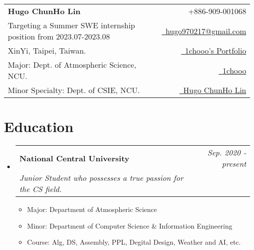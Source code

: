 \documentclass[a4paper,11pt]{article}
\makeatletter
\newcommand{\resumeSubheading}[4]{
\vspace{0.5mm}\item
    \begin{tabular*}{0.98\textwidth}[t]{l@{\extracolsep{\fill}}r}
        \textbf{#1} & \textit{\footnotesize{#4}} \\
        \textit{\footnotesize{#3}} &  \footnotesize{#2}\\
    \end{tabular*}
    \vspace{-2.4mm}
}
\newcommand{\resumeSubHeadingListStart}{\begin{itemize}[leftmargin=*,labelsep=0mm]}
\newcommand{\resumeItemListStart}{\begin{justify}\begin{itemize}[leftmargin=3ex, rightmargin=2ex, noitemsep,labelsep=1.2mm,itemsep=0mm]\small}
\newcommand{\resumeSubHeadingListEnd}{\end{itemize}\vspace{2mm}}
\newcommand{\resumeItemListEnd}{\end{itemize}\end{justify}\vspace{-2mm}}
\newcommand{\name}{Hugo ChunHo Lin} %
\newcommand{\course}{Dept. of Atmospheric Science, NCU.} %
\newcommand{\phone}{909-001068} %
\newcommand{\emaila}{hugo970217@gmail.com} %
\newcommand{\myScore}{}
\makeatother
\begin{document}
\selectfont


\parbox{\textwidth}{
\begin{tabularx}{\linewidth}{L r} \\
  \textbf{\huge \name} & {\raisebox{0.0\height}{\footnotesize \faPhone}\ +886-\phone}\\ Targeting a Summer SWE internship position from 2023.07-2023.08
   & \href{mailto:\emaila}{\raisebox{0.0\height}{\footnotesize \faEnvelope}\ {\emaila}} \\
  XinYi, Taipei, Taiwan. & \href{https://sites.google.com/g.ncu.edu.tw/1chooo/portfolio}{\raisebox{0.0\height}{\footnotesize \faGlobe}\ {1chooo's Portfolio}}\\
  {Major: \course} &  \href{https://github.com/1chooo}{\raisebox{0.0\height}{\footnotesize \faGithub}\ {1chooo}} \\
  {Minor Specialty: Dept. of CSIE, NCU.} & \href{https://www.linkedin.com/in/1chooo/}{\raisebox{0.0\height}{\footnotesize \faLinkedin}\ {Hugo ChunHo Lin}}
\end{tabularx}
}




  
%

\section{\textbf{Education}}
  \resumeSubHeadingListStart
    \resumeSubheading
      {National Central University}{\myScore}
      {Junior Student who possesses a true passion for the CS field.}{Sep. 2020 - present}
      \vspace{-1.0mm}
      \resumeItemListStart
        \item {Major: Department of Atmospheric Science}
        \item {Minor: Department of Computer Science \& Information Engineering}
        \item {Course: Alg, DS, Assembly, PPL, Degital Design, Weather and AI, etc.}
      \resumeItemListEnd      
  \resumeSubHeadingListEnd
\vspace{-5.5mm}
\end{document}
